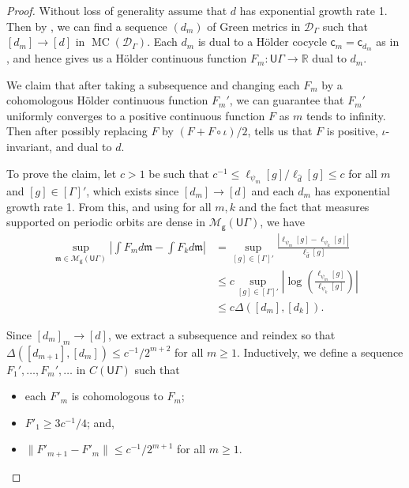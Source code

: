 \documentclass[twoside]{amsart}
\theoremstyle{definition}
\numberwithin{equation}{section}
\numberwithin{theorem}{section}
\newcommand{\msf}[1]{\mathsf{#1}}
\newcommand{\R}{\mathbb{R}}
\newcommand{\calD}{\mathcal{D}}
\newcommand{\calM}{\mathcal{M}}
\newcommand{\scrD}{\mathscr{D}}
\newcommand{\frakm}{\mathfrak{m}}
\newcommand{\G}{\Gamma}
\newcommand{\Del}{\Delta}
\newcommand{\p}{\psi}
\newcommand{\ra}{\rightarrow}
\newcommand{\UG}{\msf{U}\G}
\DeclareMathOperator{\MC}{MC}
\newcommand{\vg}{\msf{g}}
\newcommand{\vc}{\msf{c}}
\begin{document}
\begin{proof}
    Without loss of generality assume that $d$ has exponential growth rate 1. Then by , we can find a sequence $(d_m)$ of Green metrics in $\calD_\G$ such that $[d_m]\to [d]$ in $\MC(\scrD_\G)$. Each $d_m$ is dual to a H\"older cocycle $\vc_m=\vc_{d_m}$ as in , and hence  gives us a H\"older continuous function $F_m:\UG \ra \R$ dual to $d_m$. 

    We claim that after taking a subsequence and changing each $F_m$ by a cohomologous H\"older continuous function $F_m'$, we can guarantee that $F_m'$ uniformly converges to a positive continuous function $F$ as $m$ tends to infinity. Then after possibly replacing $F$ by $(F+F\circ \iota)/2$,  tells us that $F$ is positive, $\iota$-invariant, and dual to $d$. 

    To prove the claim, let $c>1$ be such that $c^{-1}\leq \ell_{\p_m}[g]/\ell_{\hat d}[g]\leq c$ for all $m$ and $[g]\in [\G]'$, which exists since $[d_m]\to [d]$ and each $d_m$ has exponential growth rate 1. From this, and using  for all $m,k$ and the fact that measures supported on periodic orbits are dense in $\calM_{\vg}(\UG)$, we have 
    \begin{equation}
    \begin{aligned}
\sup_{\frakm\in \calM_\vg(\UG)}\left|\int{F_m}{d\frakm}-\int{F_k}{d\frakm}\right| &=\sup_{[g]\in [\G]'}\frac{|\ell_{\p_m}[g]-\ell_{\p_k}[g]|}{\ell_{\hat d}[g]}\\
            &\leq c\sup_{[g]\in [\G]'}\left| \log \left(\frac{\ell_{\p_m}[g]}{\ell_{\p_k}[g]}\right)\right|\\
        &\leq c\Del([d_m],[d_k]). 
    \end{aligned}
    \label{eq:ineq.D}
    \end{equation}

Since $[d_m]_m\to [d]$, we extract a subsequence and reindex so that $\Del([d_{m+1}],[d_{m}])\leq c^{-1}/2^{m+2}$ for all $m\geq 1$. Inductively, we define a sequence $F_1',\dots,F_m',\dots$ in $C(\UG)$ such that
\begin{itemize}
    \item each $F'_m$ is cohomologous to $F_m$;
    \item $F'_1\geq 3c^{-1}/4$; and,
    \item $\|F'_{m+1}-F'_m\|\leq c^{-1}/2^{m+1}$ for all $m\geq 1$.
\end{itemize} 


\end{proof}
\end{document}
